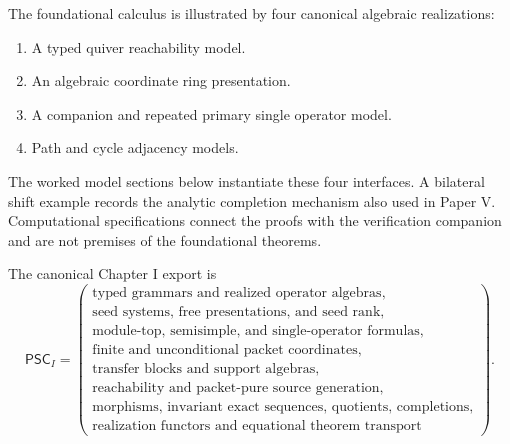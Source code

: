 \begin{definition}
\label{def:reserved-example-slots}
The foundational calculus is illustrated by four canonical algebraic realizations:
\begin{enumerate}[label=(\roman*)]
\item A typed quiver reachability model.
\item An algebraic coordinate ring presentation.
\item A companion and repeated primary single operator model.
\item Path and cycle adjacency models.
\end{enumerate}
The worked model sections below instantiate these four interfaces. A bilateral shift example records the analytic completion mechanism also used in Paper V. Computational specifications connect the proofs with the verification companion and are not premises of the foundational theorems.
\end{definition}

\begin{definition}
\label{def:paper-one-export}
The canonical Chapter I export is
\[
\boxed{
\mathsf{PSC}_I=
\left(
\begin{array}{c}
\text{typed grammars and realized operator algebras},\\
\text{seed systems, free presentations, and seed rank},\\
\text{module-top, semisimple, and single-operator formulas},\\
\text{finite and unconditional packet coordinates},\\
\text{transfer blocks and support algebras},\\
\text{reachability and packet-pure source generation},\\
\text{morphisms, invariant exact sequences, quotients, completions},\\
\text{realization functors and equational theorem transport}
\end{array}
\right).
}
\]
\end{definition}



